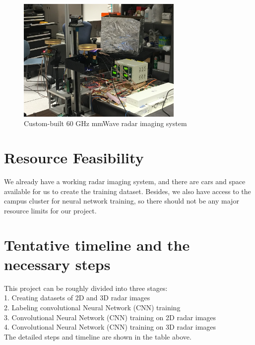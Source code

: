 \documentclass[10pt,twocolumn,letterpaper]{article}
\begin{document}
\begin{figure}
\centering
\includegraphics[width=8cm,height=6cm]{./figure/experiment_setup.jpg}
\caption{Custom-built 60 GHz mmWave radar imaging system}
\end{figure}

\section{Resource Feasibility}
We already have a working radar imaging system, and there are cars and space available for us to create the training dataset. Besides, we also have access to the campus cluster for neural network training, so there should not be any major resource limits for our project.

\section{Tentative timeline and the necessary steps}

This project can be roughly divided into three stages:\\
1. Creating datasets of 2D and 3D radar images \\
2. Labeling convolutional Neural Network (CNN) training\\
3. Convolutional Neural Network (CNN) training on 2D radar images\\
4. Convolutional Neural Network (CNN) training on 3D radar images\\
The detailed steps and timeline are shown in the table above.
\end{document}
